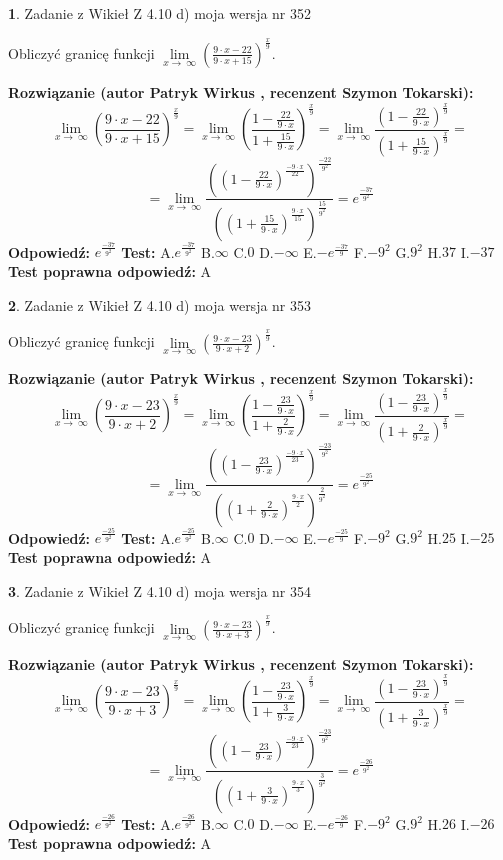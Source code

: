 \documentclass[12pt, a4paper]{article}
\theoremstyle{definition} %
\newtheorem{zad}{}
\newcommand{\zadStart}[1]{\begin{zad}#1\newline}
\newcommand{\zadStop}{\end{zad}}
\newcommand{\rozwStart}[2]{\noindent \textbf{Rozwiązanie (autor #1 , recenzent #2): }\newline}
\newcommand{\rozwStop}{\newline}
\newcommand{\odpStart}{\noindent \textbf{Odpowiedź:}\newline}
\newcommand{\odpStop}{\newline}
\newcommand{\testStart}{\noindent \textbf{Test:}\newline}
\newcommand{\testStop}{\newline}
\newcommand{\kluczStart}{\noindent \textbf{Test poprawna odpowiedź:}\newline}
\newcommand{\kluczStop}{\newline}
\begin{document}
\zadStart{Zadanie z Wikieł Z 4.10 d) moja wersja nr 352}


Obliczyć granicę funkcji  $\lim\limits_{x\to\ \infty}(\frac{9\cdot x-22}{9\cdot x+15})^{\frac{x}{9}}$.
\zadStop
\rozwStart{Patryk Wirkus}{Szymon Tokarski}
$$\lim\limits_{x\to\ \infty}(\frac{9\cdot x-22}{9\cdot x+15})^{\frac{x}{9}} = \lim\limits_{x\to\ \infty}(\frac{1-\frac{22}{9\cdot x}}{1+\frac{15}{9\cdot x}})^{\frac{x}{9}}=\lim\limits_{x\to\ \infty}\frac{(1-\frac{22}{9\cdot x})^{\frac{x}{9}}}{(1+\frac{15}{9\cdot x})^{\frac{x}{9}}}=$$
$$=\lim\limits_{x\to\ \infty}\frac{((1-\frac{22}{9\cdot x})^{\frac{-9\cdot x}{22}})^{\frac{-22}{9^{2}}}}{((1+\frac{15}{9\cdot x})^{\frac{9\cdot x}{15}})^{\frac{15}{9^{2}}}}=e^{\frac{-37}{9^{2}}}$$
\rozwStop
\odpStart
$e^{\frac{-37}{9^{2}}}$
\odpStop
\testStart
A.$e^{\frac{-37}{9^{2}}}$ B.$\infty$ C.$0$ D.$-\infty$ E.$-e^{\frac{-37}{9}}$
F.$-9^{2}$ G.$9^{2}$
H.$37$
I.$-37$
\testStop
\kluczStart
A
\kluczStop



\zadStart{Zadanie z Wikieł Z 4.10 d) moja wersja nr 353}


Obliczyć granicę funkcji  $\lim\limits_{x\to\ \infty}(\frac{9\cdot x-23}{9\cdot x+2})^{\frac{x}{9}}$.
\zadStop
\rozwStart{Patryk Wirkus}{Szymon Tokarski}
$$\lim\limits_{x\to\ \infty}(\frac{9\cdot x-23}{9\cdot x+2})^{\frac{x}{9}} = \lim\limits_{x\to\ \infty}(\frac{1-\frac{23}{9\cdot x}}{1+\frac{2}{9\cdot x}})^{\frac{x}{9}}=\lim\limits_{x\to\ \infty}\frac{(1-\frac{23}{9\cdot x})^{\frac{x}{9}}}{(1+\frac{2}{9\cdot x})^{\frac{x}{9}}}=$$
$$=\lim\limits_{x\to\ \infty}\frac{((1-\frac{23}{9\cdot x})^{\frac{-9\cdot x}{23}})^{\frac{-23}{9^{2}}}}{((1+\frac{2}{9\cdot x})^{\frac{9\cdot x}{2}})^{\frac{2}{9^{2}}}}=e^{\frac{-25}{9^{2}}}$$
\rozwStop
\odpStart
$e^{\frac{-25}{9^{2}}}$
\odpStop
\testStart
A.$e^{\frac{-25}{9^{2}}}$ B.$\infty$ C.$0$ D.$-\infty$ E.$-e^{\frac{-25}{9}}$
F.$-9^{2}$ G.$9^{2}$
H.$25$
I.$-25$
\testStop
\kluczStart
A
\kluczStop



\zadStart{Zadanie z Wikieł Z 4.10 d) moja wersja nr 354}


Obliczyć granicę funkcji  $\lim\limits_{x\to\ \infty}(\frac{9\cdot x-23}{9\cdot x+3})^{\frac{x}{9}}$.
\zadStop
\rozwStart{Patryk Wirkus}{Szymon Tokarski}
$$\lim\limits_{x\to\ \infty}(\frac{9\cdot x-23}{9\cdot x+3})^{\frac{x}{9}} = \lim\limits_{x\to\ \infty}(\frac{1-\frac{23}{9\cdot x}}{1+\frac{3}{9\cdot x}})^{\frac{x}{9}}=\lim\limits_{x\to\ \infty}\frac{(1-\frac{23}{9\cdot x})^{\frac{x}{9}}}{(1+\frac{3}{9\cdot x})^{\frac{x}{9}}}=$$
$$=\lim\limits_{x\to\ \infty}\frac{((1-\frac{23}{9\cdot x})^{\frac{-9\cdot x}{23}})^{\frac{-23}{9^{2}}}}{((1+\frac{3}{9\cdot x})^{\frac{9\cdot x}{3}})^{\frac{3}{9^{2}}}}=e^{\frac{-26}{9^{2}}}$$
\rozwStop
\odpStart
$e^{\frac{-26}{9^{2}}}$
\odpStop
\testStart
A.$e^{\frac{-26}{9^{2}}}$ B.$\infty$ C.$0$ D.$-\infty$ E.$-e^{\frac{-26}{9}}$
F.$-9^{2}$ G.$9^{2}$
H.$26$
I.$-26$
\testStop
\kluczStart
A
\kluczStop
\end{document}
